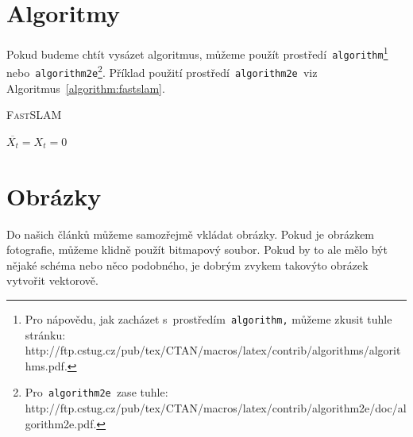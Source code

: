 \documentclass[a4paper, 11pt]{article}
\begin{document}
	\section{Algoritmy}
	\label{section:algoritmy}
	
	Pokud budeme chtít vysázet algoritmus, můžeme použít prostředí\texttt{ algorithm}\footnote{Pro nápovědu, jak zacházet s~prostředím\texttt{ algorithm,} můžeme zkusit tuhle stránku:\\
	http://ftp.cstug.cz/pub/tex/CTAN/macros/latex/contrib/algorithms/algorithms.pdf.} nebo\texttt{ algorithm2e}\footnote{Pro\texttt{ algorithm2e }zase tuhle: http://ftp.cstug.cz/pub/tex/CTAN/macros/latex/contrib/algorithm2e/doc/algorithm2e.pdf.}. Příklad použití prostředí\texttt{ algorithm2e }viz Algoritmus~\ref{algorithm:fastslam}.
	
	\IncMargin{1.5em}
	\begin{algorithm}
		\caption{\textsc{FastSLAM}}
		\label{algorithm:fastslam}
		
		\SetNlSty{}{}{:}
		\SetNlSkip{0.4em}
		\SetInd{1em}{1em}

		\Indm\Indmm
		\Indp\Indpp
		\BlankLine

		$\overline{X_t} = X_t = 0$ \\
	\end{algorithm}
	\DecMargin{1.5em}
	
	\section{Obrázky}

	Do našich článků můžeme samozřejmě vkládat obrázky. Pokud je obrázkem fotografie, můžeme klidně použít bitmapový soubor. Pokud by to ale mělo být nějaké schéma nebo něco podobného, je dobrým zvykem takovýto obrázek vytvořit vektorově.
\end{document}
